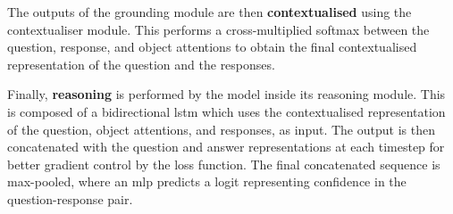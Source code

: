 The outputs of the grounding module are then \textbf{contextualised} using the contextualiser module.
This performs a cross-multiplied softmax between the question, response, and object attentions to obtain the final contextualised representation of the question and the responses.

Finally, \textbf{reasoning} is performed by the model inside its reasoning module.
This is composed of a bidirectional \gls{lstm} which uses the contextualised representation of the question, object attentions, and responses, as input.
The output is then concatenated with the question and answer representations at each timestep for better gradient control by the loss function.
The final concatenated sequence is max-pooled, where an \gls{mlp} predicts a \gls{logit} representing confidence in the question-response pair.

